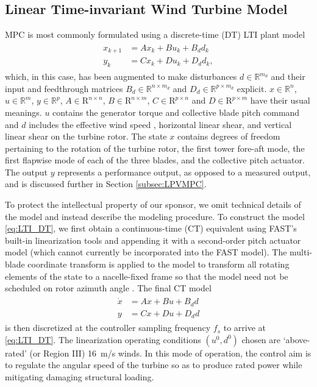 \documentclass[letterpaper, 10 pt, conference]{ieeeconf}  %
\begin{document}
\subsection{Linear Time-invariant Wind Turbine Model}\label{subsec:LTImodel}

MPC is most commonly formulated using a discrete-time (DT) LTI plant model
\begin{align}\label{eq:LTI_DT}
\begin{split}
x_{k+1} &= Ax_{k} + Bu_{k} + B_d d_k \\
y_k &= Cx_k + Du_k + D_d d_k,
\end{split}
\end{align}
which, in this case, has been augmented to make disturbances $d\in\mathbb{R}^{m_d}$ and their input and feedthrough matrices $B_d\in\mathbb{R}^{n\times m_d}$ and $D_d\in\mathbb{R}^{p\times m_d}$ explicit. $x\in\mathbb{R}^n$, $u\in\mathbb{R}^m$, $y\in\mathbb{R}^p$, $A \in \mathrm{R}^{n\times n}$, $B\in \mathrm{R}^{n\times m}$, $C\in \mathrm{R}^{p\times n}$ and $D\in \mathrm{R}^{p\times m}$ have their usual meanings. $u$ contains the generator torque and collective blade pitch command and  $d$ includes the effective wind speed \cite{SimleyPao2015}, horizontal linear shear, and vertical linear shear on the turbine rotor. The state $x$ contains degrees of freedom pertaining to the rotation of the turbine rotor, the first tower fore-aft mode, the first flapwise mode of each of the three blades, and the collective pitch actuator. The output $y$ represents a performance output, as opposed to a measured output, and is discussed further in Section \ref{subsec:LPVMPC}.

To protect the intellectual property of our sponsor, we omit technical details of the model and instead describe the modeling procedure. To construct the model \eqref{eq:LTI_DT}, we first obtain a continuous-time (CT) equivalent using FAST's built-in linearization tools and appending it with a second-order pitch actuator model (which cannot currently be incorporated into the FAST model). The multi-blade coordinate transform is applied to the model to transform all rotating elements of the state to a nacelle-fixed frame so that the model need not be scheduled on rotor azimuth angle \cite{Bir2008}. The final CT model
\begin{align}\label{eq:LTI_CT}
\begin{split}
\dot{x} &= Ax + Bu + B_d d \\
y &= Cx + Du + D_d d
\end{split}
\end{align}
is then discretized at the controller sampling frequency $f_s$ to arrive at \eqref{eq:LTI_DT}. The linearization operating conditions $(u^0, d^0)$ chosen are `above-rated' (or Region III) 16~m/s winds. In this mode of operation, the control aim is to regulate the angular speed of the turbine so as to produce rated power while mitigating damaging structural loading.
\end{document}
